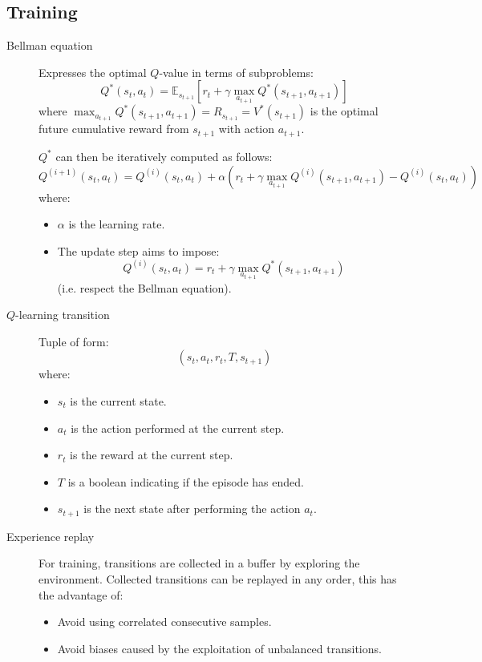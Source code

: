 \subsection{Training}
\begin{description}
    \item[Bellman equation] 
        Expresses the optimal $Q$-value in terms of subproblems:
        \[ Q^*(s_t, a_t) = \mathbb{E}_{s_{t+1}} \left[ r_t + \gamma \max_{a_{t+1}} Q^*(s_{t+1}, a_{t+1}) \right] \]
        where $\max_{a_{t+1}} Q^*(s_{t+1}, a_{t+1}) = R_{s_{t+1}} = V^*(s_{t+1})$ is the optimal future cumulative reward from $s_{t+1}$ with action $a_{t+1}$.

        $Q^*$ can then be iteratively computed as follows:
        \[ Q^{(i+1)}(s_t, a_t) = Q^{(i)}(s_t, a_t) + \alpha\left( r_t + \gamma \max_{a_{t+1}} Q^{(i)}(s_{t+1}, a_{t+1}) - Q^{(i)}(s_t, a_t) \right) \]
        where:
        \begin{itemize}
            \item $\alpha$ is the learning rate.
            \item The update step aims to impose: 
                \[ Q^{(i)}(s_t, a_t) = r_t + \gamma \max_{a_{t+1}} Q^*(s_{t+1}, a_{t+1}) \]
                (i.e. respect the Bellman equation).
        \end{itemize}

    \item[$Q$-learning transition] 
        Tuple of form:
        \[ (s_t, a_t, r_t, T, s_{t+1}) \]
        where:
        \begin{itemize}
            \item $s_t$ is the current state.
            \item $a_t$ is the action performed at the current step.
            \item $r_t$ is the reward at the current step.
            \item $T$ is a boolean indicating if the episode has ended.
            \item $s_{t+1}$ is the next state after performing the action $a_t$.
        \end{itemize}

        
        \item[Experience replay] 
        For training, transitions are collected in a buffer by exploring the environment.
        Collected transitions can be replayed in any order, this has the advantage of:
        \begin{itemize}
            \item Avoid using correlated consecutive samples.
            \item Avoid biases caused by the exploitation of unbalanced transitions.
        \end{itemize}


\end{description}
